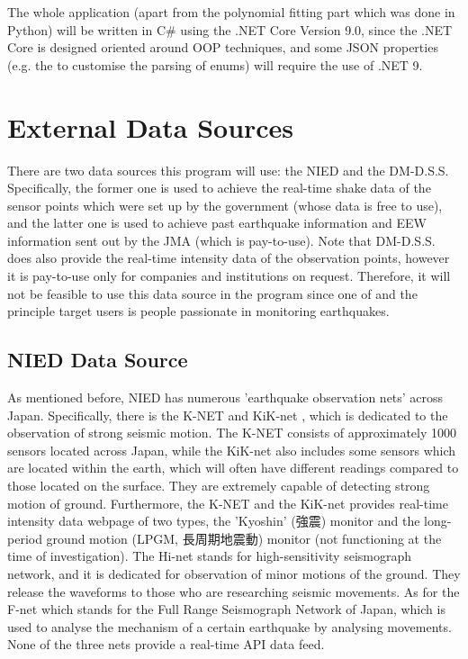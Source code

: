 The whole application (apart from the polynomial fitting part which was done in Python) will be written in C\# using the .NET Core Version 9.0, since the .NET Core is designed oriented around OOP techniques, and some JSON properties (e.g. the  to customise the parsing of enums) will require the use of .NET 9.

\section{External Data Sources}
There are two data sources this program will use: the NIED and the DM-D.S.S. Specifically, the former one is used to achieve the real-time shake data of the sensor points which were set up by the government (whose data is free to use), and the latter one is used to achieve past earthquake information and EEW information sent out by the JMA (which is pay-to-use). Note that DM-D.S.S. does also provide the real-time intensity data of the observation points, however it is pay-to-use only for companies and institutions on request. Therefore, it will not be feasible to use this data source in the program since one of and the principle target users is people passionate in monitoring earthquakes.

\subsection{NIED Data Source}

As mentioned before, NIED has numerous 'earthquake observation nets' across Japan. Specifically, there is the K-NET and KiK-net \autocite{nied-k-kik-net}, which is dedicated to the observation of strong seismic motion. The K-NET consists of approximately 1000 sensors located across Japan, while the KiK-net also includes some sensors which are located within the earth, which will often have different readings compared to those located on the surface. They are extremely capable of detecting strong motion of ground. Furthermore, the K-NET and the KiK-net provides real-time intensity data webpage of two types, the 'Kyoshin' (強震) monitor \autocite{nied-kmoni} and the long-period ground motion (LPGM, 長周期地震動) monitor \autocite{nied-lmoni} (not functioning at the time of investigation). The Hi-net \autocite{nied-hi-net} stands for high-sensitivity seismograph network, and it is dedicated for observation of minor motions of the ground. They release the waveforms to those who are researching seismic movements. As for the F-net \autocite{nied-f-net} which stands for the Full Range Seismograph Network of Japan, which is used to analyse the mechanism of a certain earthquake by analysing movements. None of the three nets provide a real-time API data feed.


